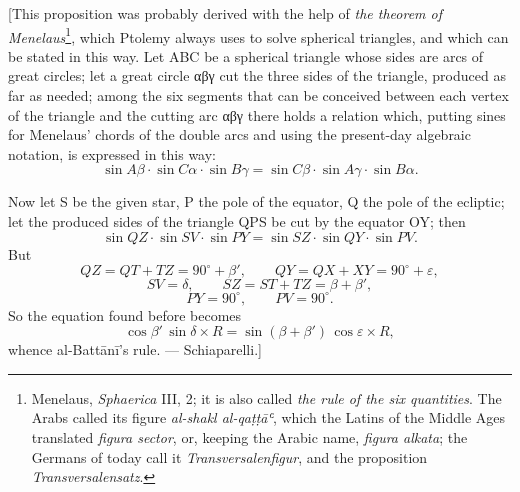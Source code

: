 \documentclass[11pt]{article}
\newcommand{\Pg}[1]{\marginpar{\footnotesize\color{gray}#1}}
\begin{document}
\par \Pg{I 193}[This proposition was probably derived with the help of \emph{the theorem of Menelaus}\footnote{Menelaus, \emph{Sphaerica} III, 2; it is also called \emph{the rule of the six quantities}. The Arabs called its figure \emph{al-shakl al-qaṭṭāʿ}, which the Latins of the Middle Ages translated \emph{figura sector}, or, keeping the Arabic name, \emph{figura alkata}; the Germans of today call it \emph{Transversalenfigur}, and the proposition \emph{Transversalensatz}.}, which Ptolemy always uses to solve spherical triangles, and which can be stated in this way. Let ABC be a spherical triangle whose sides are arcs of great circles; let a great circle {\greekfont αβγ} cut the three sides of the triangle, produced as far as needed; among the six segments that can be conceived between each vertex of the triangle and the cutting arc {\greekfont αβγ} there holds a relation which, putting sines for Menelaus' chords of the double arcs and using the present-day algebraic notation, is expressed in this way: \[ \sin A\beta \cdot \sin C\alpha \cdot \sin B\gamma = \sin C\beta \cdot \sin A\gamma \cdot \sin B\alpha. \]\par
\begin{center}\end{center}
\par Now let S be the given star, P the pole of the equator, Q the pole of the ecliptic; let the produced sides of the triangle QPS be cut by the equator OY; then \[ \sin QZ \cdot \sin SV \cdot \sin PY = \sin SZ \cdot \sin QY \cdot \sin PV. \] But \[ QZ = QT + TZ = 90^\circ + \beta', \qquad QY = QX + XY = 90^\circ + \varepsilon, \] \[ SV = \delta, \qquad SZ = ST + TZ = \beta + \beta', \] \[ PY = 90^\circ, \qquad PV = 90^\circ. \] So the equation found before becomes \[ \cos\beta'\,\sin\delta \times R = \sin(\beta + \beta')\,\cos\varepsilon \times R, \] whence al-Battānī's rule. — Schiaparelli.]\par
\end{document}
